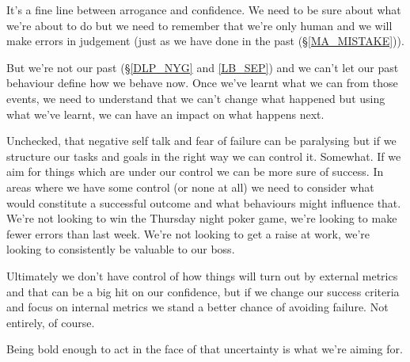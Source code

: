 \cleardoublepage
\begin{multicols}{2}

It's a fine line between arrogance and confidence. We need to be sure about what we're about to do but we need to remember that we're only human and we will make errors in judgement (just as we have done in the past (\S \ref{MA_MISTAKE})). 

But we're not our past (\S \ref{DLP_NYG} and \ref{LB_SEP}) and we can't let our past behaviour define how we behave now. Once we've learnt what we can from those events, we need to understand that we can't change what happened but using what we've learnt, we can have an impact on what happens next.

Unchecked, that negative self talk and fear of failure can be paralysing but if we structure our tasks and goals in the right way we can control it. Somewhat. If we aim for things which are under our control we can be more sure of success. In areas where we have some control (or none at all) we need to consider what would constitute a successful outcome and what behaviours might influence that. We're not looking to win the Thursday night poker game, we're looking to make fewer errors than last week. We're not looking to get a raise at work, we're looking to consistently be valuable to our boss.

Ultimately we don't have control of how things will turn out by external metrics and that can be a big hit on our confidence, but if we change our success criteria and focus on internal metrics we stand a better chance of avoiding failure. Not entirely, of course.

Being bold enough to act in the face of that uncertainty is what we're aiming for.



\end{multicols}
\clearpage
